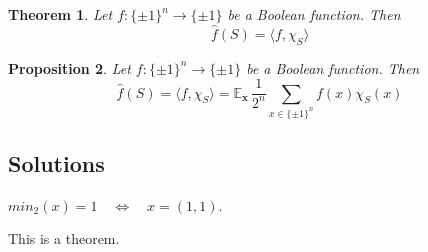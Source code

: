 \documentclass[11pt]{article}
\numberwithin{equation}{section}
\newtheorem{thm}{Theorem}[section]
\newtheorem{prop}[thm]{Proposition}
\theoremstyle{definition}
\newenvironment{sol}[1]{%
  \renewcommand\thesolinner{#1}%
  \solinner
}{\endsolinner}
\begin{document}
\begin{thm}\label{thm:fourier_expansion}
	Let $f:\{\pm 1\}^n \to \{\pm 1\}$ be a Boolean function. Then
	$$\hat{f}(S) = \langle f, \chi_S \rangle$$
\end{thm}

\begin{prop}\label{fourier_coef}
Let $f:\{\pm 1\}^n \to \{\pm 1\}$ be a Boolean function. Then
	$$\hat{f}(S) = \langle f, \chi_S \rangle = \mathbb{E}_{\bm{x} ~ } \frac{1}{2^n} \sum_{x \in \{\pm 1\}^n} f(x) \chi_S(x)$$
\end{prop}

\clearpage

\subsection*{Solutions}

\begin{sol}{1.1(a)}\label{1.1(a)}
	$min_2(x) = 1 \quad \iff \quad x = (1, 1)$. 
\end{sol}


\begin{sol}{A}[title]\label{baz}
This is a theorem.
\end{sol}


\clearpage



\end{document}
